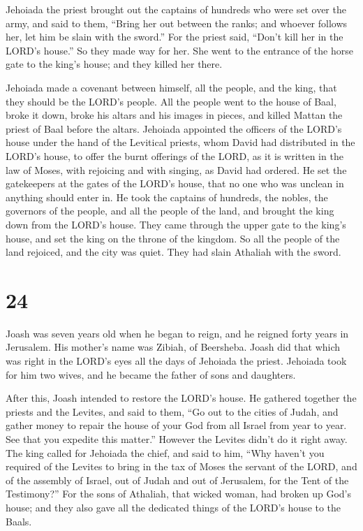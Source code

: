  Jehoiada the priest brought out the captains of hundreds
who were set over the army, and said to them, ``Bring her out between
the ranks; and whoever follows her, let him be slain with the sword.''
For the priest said, ``Don't kill her in the LORD's house.''
 So they made way for her. She went to the entrance of the
horse gate to the king's house; and they killed her there.

 Jehoiada made a covenant between himself, all the people,
and the king, that they should be the LORD's people.  All
the people went to the house of Baal, broke it down, broke his altars
and his images in pieces, and killed Mattan the priest of Baal before
the altars.  Jehoiada appointed the officers of the LORD's
house under the hand of the Levitical priests, whom David had
distributed in the LORD's house, to offer the burnt offerings of the
LORD, as it is written in the law of Moses, with rejoicing and with
singing, as David had ordered.  He set the gatekeepers at
the gates of the LORD's house, that no one who was unclean in anything
should enter in.  He took the captains of hundreds, the
nobles, the governors of the people, and all the people of the land, and
brought the king down from the LORD's house. They came through the upper
gate to the king's house, and set the king on the throne of the kingdom.
 So all the people of the land rejoiced, and the city was
quiet. They had slain Athaliah with the sword.

\hypertarget{section-23}{%
\section{24}\label{section-23}}

 Joash was seven years old when he began to reign, and he
reigned forty years in Jerusalem. His mother's name was Zibiah, of
Beersheba.  Joash did that which was right in the LORD's
eyes all the days of Jehoiada the priest.  Jehoiada took for
him two wives, and he became the father of sons and daughters.

 After this, Joash intended to restore the LORD's house.
 He gathered together the priests and the Levites, and said
to them, ``Go out to the cities of Judah, and gather money to repair the
house of your God from all Israel from year to year. See that you
expedite this matter.'' However the Levites didn't do it right away.
 The king called for Jehoiada the chief, and said to him,
``Why haven't you required of the Levites to bring in the tax of Moses
the servant of the LORD, and of the assembly of Israel, out of Judah and
out of Jerusalem, for the Tent of the Testimony?''  For the
sons of Athaliah, that wicked woman, had broken up God's house; and they
also gave all the dedicated things of the LORD's house to the Baals.

